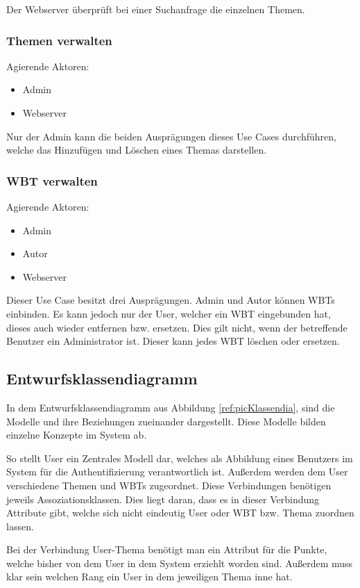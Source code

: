 Der Webserver überprüft bei einer Suchanfrage die einzelnen Themen.
	
\subsubsection{Themen verwalten}
Agierende Aktoren: \begin{itemize}
  \item Admin
  \item Webserver
\end{itemize}

Nur der Admin kann die beiden Ausprägungen dieses Use Cases durchführen, welche
das Hinzufügen und Löschen eines Themas darstellen.
	
\subsubsection{WBT verwalten}
Agierende Aktoren: \begin{itemize}
  \item Admin
  \item Autor
  \item Webserver
\end{itemize}

Dieser Use Case besitzt drei Ausprägungen. Admin und Autor können WBTs
einbinden. Es kann jedoch nur der User, welcher ein WBT eingebunden hat, dieses
auch wieder entfernen bzw. ersetzen. Dies gilt nicht, wenn der betreffende
Benutzer ein Administrator ist. Dieser kann jedes WBT löschen oder ersetzen.
	

\subsection{Entwurfsklassendiagramm}
In dem Entwurfsklassendiagramm aus Abbildung \ref{ref:picKlassendia}, sind die
Modelle und ihre Beziehungen zueinander dargestellt. Diese Modelle bilden
einzelne Konzepte im System ab. 

So stellt User ein Zentrales Modell dar, welches als Abbildung eines Benutzers
im System für die Authentifizierung verantwortlich ist. Außerdem werden dem User
verschiedene Themen und WBTs zugeordnet. Diese Verbindungen benötigen jeweils
Assoziationsklassen. Dies liegt daran, dass es in dieser Verbindung Attribute
gibt, welche sich nicht eindeutig User oder WBT bzw. Thema zuordnen lassen.

Bei der Verbindung User-Thema benötigt man ein Attribut für die Punkte, welche
bisher von dem User in dem System erziehlt worden sind. Außerdem muss klar sein
welchen Rang ein User in dem jeweiligen Thema inne hat.

